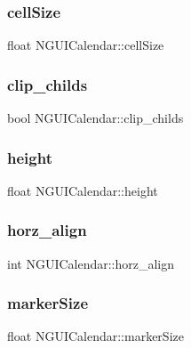 \subsubsection{\texorpdfstring{cell\+Size}{cellSize}}
{\footnotesize\ttfamily float N\+G\+U\+I\+Calendar\+::cell\+Size}

\hypertarget{class_n_g_u_i_calendar_a7909b7a36ce50dcc4d87b405aa471716}{}\label{class_n_g_u_i_calendar_a7909b7a36ce50dcc4d87b405aa471716} 
\subsubsection{\texorpdfstring{clip\+\_\+childs}{clip\_childs}}
{\footnotesize\ttfamily bool N\+G\+U\+I\+Calendar\+::clip\+\_\+childs}

\hypertarget{class_n_g_u_i_calendar_ad8b0a35fecc97a8e5557cde144abc10d}{}\label{class_n_g_u_i_calendar_ad8b0a35fecc97a8e5557cde144abc10d} 
\subsubsection{\texorpdfstring{height}{height}}
{\footnotesize\ttfamily float N\+G\+U\+I\+Calendar\+::height}

\hypertarget{class_n_g_u_i_calendar_a1b380a7971e89882d15e6ef84ce33f34}{}\label{class_n_g_u_i_calendar_a1b380a7971e89882d15e6ef84ce33f34} 
\subsubsection{\texorpdfstring{horz\+\_\+align}{horz\_align}}
{\footnotesize\ttfamily int N\+G\+U\+I\+Calendar\+::horz\+\_\+align}

\hypertarget{class_n_g_u_i_calendar_a0abe69ad0da82b6ec0d3c563fbfd238e}{}\label{class_n_g_u_i_calendar_a0abe69ad0da82b6ec0d3c563fbfd238e} 
\subsubsection{\texorpdfstring{marker\+Size}{markerSize}}
{\footnotesize\ttfamily float N\+G\+U\+I\+Calendar\+::marker\+Size}

